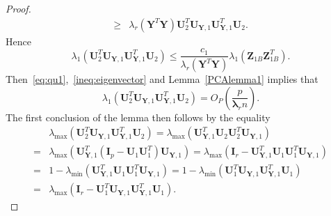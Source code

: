 \documentclass[12pt]{article} %
\newcommand{\bZ}{\mathbf{Z}}
\newcommand{\bY}{\mathbf{Y}}
\newcommand{\bI}{\mathbf{I}}
\newcommand{\bU}{\mathbf{U}}
\newcommand{\bfsym}[1]{\ensuremath{\boldsymbol{#1}}}
\def\blambda {\bfsym {\lambda}}
\theoremstyle{definition}
\begin{document}
\begin{appendices}
\begin{proof}
$$\begin{aligned}
\geq&
    \lambda_r(\bY^T \bY) \bU_{2}^T \bU_{\bY,1}\bU_{\bY,1}^T \bU_{2}.
\end{aligned}
$$
Hence
    \begin{equation}\label{ineq:eigenvector}
\lambda_{1}(\bU_{2}^T \bU_{\bY,1} \bU_{\bY,1}^T \bU_{2})\leq
\frac{c_1}{\lambda_r(\bY^T \bY)} \lambda_{1}
(\bZ_{1B} \bZ_{1B}^T).
    \end{equation}
    Then~\eqref{eq:qu1},~\eqref{ineq:eigenvector} and Lemma~\ref{PCAlemma1} implies that
    $$\lambda_{1}(\bU_{2}^T \bU_{\bY,1} \bU_{\bY,1}^T \bU_{2})=O_P(\frac{p}{\blambda_r n}).
    $$
 The first conclusion of the lemma then follows by the equality
$$
\begin{aligned}
&\lambda_{\max}(\bU_{2}^T \bU_{\bY,1} \bU_{\bY,1}^T \bU_{2})
=
\lambda_{\max}(\bU_{\bY,1}^T \bU_{2} \bU_{2}^T \bU_{\bY,1})\\
=&
    \lambda_{\max}(\bU_{\bY,1}^T (\bI_p-\bU_{1} \bU_{1}^T) \bU_{\bY,1})
    =
\lambda_{\max}(\bI_r-\bU_{\bY,1}^T\bU_{1} \bU_{1}^T \bU_{\bY,1})\\
=&
1-\lambda_{\min}(\bU_{\bY,1}^T\bU_{1} \bU_{1}^T \bU_{\bY,1})
=
1-\lambda_{\min}( \bU_{1}^T \bU_{\bY,1}\bU_{\bY,1}^T\bU_{1})\\
=&
\lambda_{\max}(\bI_r-\bU_{1}^T \bU_{\bY,1}\bU_{\bY,1}^T\bU_{1}).
\end{aligned}
$$


\end{proof}
\end{appendices}
\end{document}
